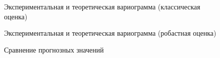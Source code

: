 \begin{figure}[H]
\caption{Экспериментальная и теоретическая вариограмма (классическая оценка)}
\label{img:classical-mod}
\end{figure}

\begin{figure}[H]
\caption{Экспериментальная и теоретическая вариограмма (робастная оценка)}
\label{img:robust-mod}
\end{figure}

\begin{figure}[H]
\caption{Сравнение прогнозных значений}
\label{img:cross-prediction-best}
\end{figure}

